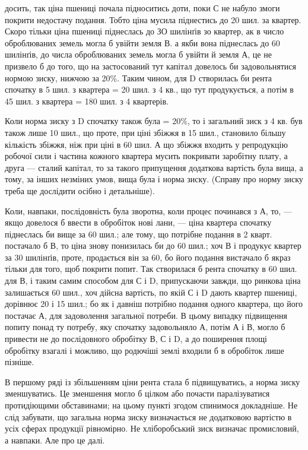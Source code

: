 досить, так ціна пшениці почала підноситись доти, поки С не набуло змоги
покрити недостачу подання. Тобто ціна мусила піднестись до 20 шил. за
квартер. Скоро тільки ціна пшениці піднеслась до ЗО шилінґів зо квартер, ак
в число оброблюваних земель могла б увійти земля В. а якби вона піднеслась
до 60 шилінґів, до числа оброблюваних земель могла б увійти й земля А, це
не призвело б до того, що на застосований тут капітал довелось би задовольнятися
нормою зиску, нижчою за 20\%. Таким чином, для D створилась би
рента спочатку в 5 шил. з квартера = 20 шил. з 4 кв., що тут продукується,
а потім в 45 шил. з квартера = 180 шил. з 4 квартерів.

Коли норма зиску з D спочатку також була = 20\%, то і загальний зиск
з 4 кв. був також лише 10 шил., що проте, при ціні збіжжя в 15 шил., становило
більшу кількість збіжжя, ніж при ціні в 60 шил. А що збіжжя входить
у репродукцію робочої сили і частина кожного квартера мусить покривати заробітну
плату, а друга — сталий капітал, то за такого припущення додаткова
вартість була вища, а тому, за інших незміних умов, вища була і норма зиску.
(Справу про норму зиску треба ще дослідити осібно і детальніше).

Коли, навпаки, послідовність була зворотна, коли процес починався з А,
то, — якщо довелося б ввести в обробіток нові лани, — ціна квартера спочатку
піднеслась би вище за 60 шил.; але тому, що потрібне подання в 2 кварт. постачало
б В, то ціна знову понизилась би до 60 шил.; хоч В і продукує квартер
за 30 шилінґів, проте, продається він за 60, бо його подання вистачало б
якраз тільки для того, щоб покрити попит. Так створилася б рента спочатку в
60 шил. для В, і таким самим способом для С і D, припускаючи завжди, що
ринкова ціна залишається 60 шил., хоч дійсна вартість, по якій С і D дають
квартер пшениці, дорівнює 20 і 15 шил.; бо як і давніш потрібно подання одного
квартера, що його постачає А, для задоволення загальної потреби. В цьому випадку
підвищення попиту понад ту потребу, яку спочатку задовольняло А, потім
А і В, могло б привести не до послідовного обробітку В, С і D, а до поширення
площі обробітку взагалі і можливо, що родючіші землі входили б в обробіток
лише пізніше.

В першому ряді із збільшенням ціни рента стала б підвищуватись, а норма
зиску зменшуватись. Це зменшення могло б цілком або почасти паралізуватися
протидіющими обставинами; на цьому пункті згодом спинимося докладніше.
Не слід забувати, що загальна норма зиску визначається не додатковою вартістю
в усіх сферах продукції рівномірно. Не хліборобський зиск визначає промисловий,
а навпаки. Але про це далі.

